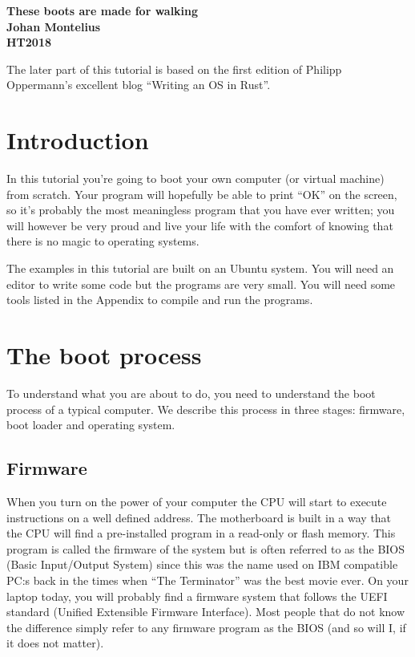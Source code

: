 \documentclass[a4paper,11pt]{article}
\begin{document}
\begin{center} \vspace{20pt} \textbf{\large These boots are made for walking}\\
  \vspace{10pt} \textbf{Johan Montelius}\\ \vspace{10pt} \textbf{HT2018}
\end{center}


 The later part of this tutorial is based on the
first edition of Philipp Oppermann's excellent blog ``Writing an OS in
Rust''.


\section{Introduction}

In this tutorial you're going to boot your own computer (or virtual
machine) from scratch. Your program will hopefully be able to print
``OK'' on the screen, so it's probably the most meaningless program that
you have ever written; you will however be very proud and live your
life with the comfort of knowing that there is no magic to operating
systems.

The examples in this tutorial are built on an Ubuntu system. You will
need an editor to write some code but the programs are very small. You
will need some tools listed in the Appendix to compile and run the
programs.


\section{The boot process}

To understand what you are about to do, you need to understand the
boot process of a typical computer. We describe this process in three
stages: firmware, boot loader and operating system.

\subsection{Firmware}

When you turn on the power of your computer the CPU will start to
execute instructions on a well defined address. The motherboard is
built in a way that the CPU will find a pre-installed program in a
read-only or flash memory. This program is called the firmware of the
system but is often referred to as the BIOS (Basic Input/Output System)
since this was the name used on IBM compatible PC:s back in the
times when ``The Terminator'' was the best movie ever. On your laptop
today, you will probably find a firmware system that follows the UEFI
standard (Unified Extensible Firmware Interface). Most people that do
not know the difference simply refer to any firmware program as the
BIOS (and so will I, if it does not matter).
\end{document}
